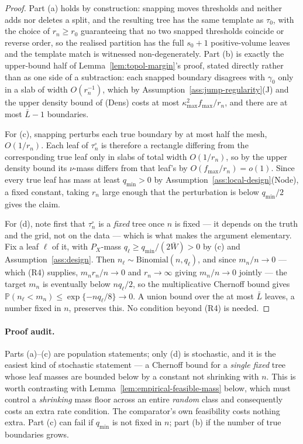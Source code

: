 \documentclass[11pt]{article}
\theoremstyle{plain}
\theoremstyle{definition}
\theoremstyle{remark}
\newcommand{\PP}{\mathbb{P}}
\begin{document}
\begin{proof}
Part (a) holds by construction: snapping moves thresholds and neither adds nor
deletes a split, and the resulting tree has the same template as \(\tau_0\),
with the choice of \(r_n\ge r_0\) guaranteeing that no two snapped thresholds
coincide or reverse order, so the realised partition has the full
\(s_0+1\) positive-volume leaves and the template match is witnessed
non-degenerately. Part (b) is exactly the upper-bound half of
Lemma~\ref{lem:topol-margin}'s proof, stated directly rather than as one side
of a subtraction: each snapped boundary disagrees with \(\gamma_0\) only in a
slab of width \(O(r_n^{-1})\), which by
Assumption~\ref{ass:jump-regularity}(J) and the upper density bound of (Dens)
costs at most \(\kappa_{\max}^2f_{\max}/r_n\), and there are at most
\(\bar L-1\) boundaries.

For (c), snapping perturbs each true boundary by at most half the mesh,
\(O(1/r_n)\). Each leaf of \(\tau_n^\circ\) is therefore a rectangle differing
from the corresponding true leaf only in slabs of total width \(O(1/r_n)\), so
by the upper density bound its \(\nu\)-mass differs from that leaf's by
\(O(f_{\max}/r_n)=o(1)\). Since every true leaf has mass at least
\(q_{\min}>0\) by Assumption~\ref{ass:local-design}(Node), a fixed constant,
taking \(r_n\) large enough that the perturbation is below \(q_{\min}/2\)
gives the claim.

For (d), note first that \(\tau_n^\circ\) is a \emph{fixed} tree once \(n\) is
fixed --- it depends on the truth and the grid, not on the data --- which is
what makes the argument elementary. Fix a leaf \(\ell\) of it, with
\(P_X\)-mass \(q_\ell\ge q_{\min}/(2\bar W)>0\) by (c) and
Assumption~\ref{ass:design}. Then \(n_\ell\sim\mathrm{Binomial}(n,q_\ell)\),
and since \(m_n/n\to0\) --- which (R4) supplies, \(m_nr_n/n\to0\) and
\(r_n\to\infty\) giving \(m_n/n\to0\) jointly --- the target \(m_n\) is
eventually below \(nq_\ell/2\), so the multiplicative Chernoff bound gives
\(\PP(n_\ell<m_n)\le\exp\{-nq_\ell/8\}\to0\). A union bound over the at most
\(\bar L\) leaves, a number fixed in \(n\), preserves this. No condition
beyond (R4) is needed.
\end{proof}

\paragraph{Proof audit.}
Parts (a)--(c) are population statements; only (d) is stochastic, and it is
the easiest kind of stochastic statement --- a Chernoff bound for a
\emph{single fixed} tree whose leaf masses are bounded below by a constant not
shrinking with \(n\). This is worth contrasting with
Lemma~\ref{lem:empirical-feasible-mass} below, which must control a
\emph{shrinking} mass floor across an entire \emph{random} class and
consequently costs an extra rate condition. The comparator's own feasibility
costs nothing extra. Part (c) can fail if \(q_{\min}\) is not fixed in \(n\);
part (b) if the number of true boundaries grows.
\end{document}
